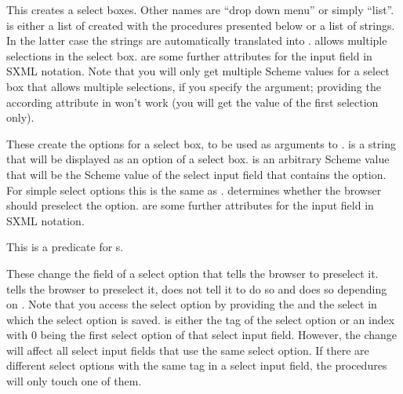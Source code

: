 \begin{desc}
  This creates a select boxes.  Other names are ``drop down menu'' or
  simply ``list''.   is either a list of
   created with the procedures presented below or a
  list of strings.  In the latter case the strings are automatically
  translated into .    allows
  multiple selections in the select box.   are some
  further attributes for the input field in SXML notation.  Note that
  you will only get multiple Scheme values for a select box that
  allows multiple selections, if you specify the 
  argument; providing the according attribute in 
  won't work (you will get the value of the first selection only).
\end{desc}

\begin{desc}
  These create the options for a select box, to be used as arguments
  to .   is a string that will be displayed
  as an option of a select box.   is an arbitrary Scheme
  value that will be the Scheme value of the select input field 
  that contains the option.  For simple select options this is the same as
  .   determines whether the browser should
  preselect the option.   are some further attributes
  for the input field in SXML notation.
\end{desc}

\begin{desc}
  This is a predicate for s.
\end{desc}

\begin{desc}
  These change the  field of a select option that tells
  the browser to preselect it.   tells the
  browser to preselect it,  does not tell
  it to do so and  does so depending
  on .  Note that you access the select option by
  providing the  and the select  in which
  the select option is saved.   is either the tag of the
  select option or an index with 0 being the first select option of
  that select input field.  However, the change will affect all select
  input fields that use the same select option.  If there are
  different select options with the same tag in a select input field,
  the procedures will only touch one of them.

\end{desc}


